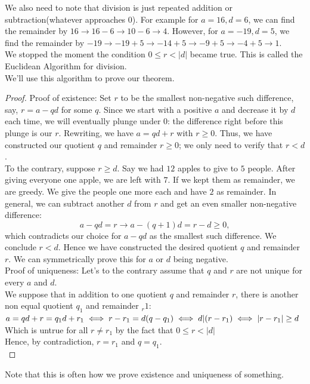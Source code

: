 We also need to note that division is just repeated addition or subtraction(whatever approaches 0). For example for $a=16, d=6$, we can find the remainder by $16 \to 16-6 \to 10-6 \to 4$. However, for $a=-19, d=5$, we find the remainder by $-19 \to -19+5 \to -14+5 \to -9+5 \to -4+5 \to 1$.\\
We stopped the moment the condition $0 \leq r <|d|$ became true. This is called the Euclidean Algorithm for division.\\
We'll use this algorithm to prove our theorem.\\
\begin{proof}
Proof of existence: Set $r$ to be the smallest non-negative such difference, say, $r = a - qd$ for some $q$. Since we start with a positive $a$ and decrease it by $d$ each time, we will eventually plunge under $0$: the difference right before this plunge is our $r$. Rewriting, we have $a = qd + r$ with $r \geq 0$. Thus, we have constructed our quotient $q$ and remainder $r \geq 0$; we only need to verify that $r < d$.\\
To the contrary, suppose $r \geq d$. Say we had $12$ apples to give to $5$ people. After giving everyone one apple, we are left with $7$. If we kept them as remainder, we are greedy. We give the people one more each and have $2$ as remainder. In general, we can subtract another $d$ from $r$ and get an even smaller non-negative difference: 
\[a - qd = r \rightarrow a - (q + 1)d = r - d \geq 0,\]
which contradicts our choice for $a - qd$ as the smallest such difference. We conclude $r < d$. Hence we have constructed the desired quotient $q$ and remainder $r$. We can symmetrically prove this for $a$ or $d$ being negative.\\
Proof of uniqueness: Let's to the contrary assume that $q$ and $r$ are not unique for every $a$ and $d$.\\
We suppose that in addition to one quotient $q$ and remainder $r$, there is another non equal quotient $q_1$ and remainder $_r1$:
$a = qd + r = q_1d + r_1\\
\iff r-r_1=d(q-q_1)\\
\iff d|(r-r_1)\\
\iff |r-r_1| \geq d$\\
Which is untrue for all $r \neq r_1$ by the fact that $0 \leq r < |d|$\\
Hence, by contradiction, $r=r_1$ and $q=q_1$.\\
\end{proof}
Note that this is often how we prove existence and uniqueness of something.\\
